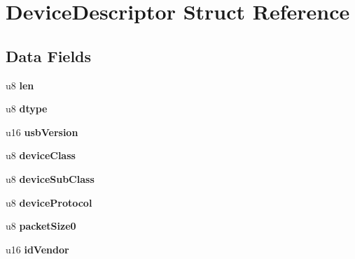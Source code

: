 \hypertarget{struct_device_descriptor}{\section{Device\-Descriptor Struct Reference}
\label{struct_device_descriptor}
}
\subsection*{Data Fields}
\begin{DoxyCompactItemize}
\item 
\hypertarget{struct_device_descriptor_afbf3f3230446569534d5f466aaf4c23b}{u8 {\bfseries len}}\label{struct_device_descriptor_afbf3f3230446569534d5f466aaf4c23b}

\item 
\hypertarget{struct_device_descriptor_a0bb419531ec75697e63e9109fecf81b0}{u8 {\bfseries dtype}}\label{struct_device_descriptor_a0bb419531ec75697e63e9109fecf81b0}

\item 
\hypertarget{struct_device_descriptor_a0d9dca86e0ffcd6d89828e4b8b0eb8a0}{u16 {\bfseries usb\-Version}}\label{struct_device_descriptor_a0d9dca86e0ffcd6d89828e4b8b0eb8a0}

\item 
\hypertarget{struct_device_descriptor_ac951c25b0d755d42cb5f4a13692d511c}{u8 {\bfseries device\-Class}}\label{struct_device_descriptor_ac951c25b0d755d42cb5f4a13692d511c}

\item 
\hypertarget{struct_device_descriptor_a243c174d359ded5ed54cf06d979cab2a}{u8 {\bfseries device\-Sub\-Class}}\label{struct_device_descriptor_a243c174d359ded5ed54cf06d979cab2a}

\item 
\hypertarget{struct_device_descriptor_a1fd727fcfe6f95b1da93b158569777dd}{u8 {\bfseries device\-Protocol}}\label{struct_device_descriptor_a1fd727fcfe6f95b1da93b158569777dd}

\item 
\hypertarget{struct_device_descriptor_a8ccac084f7a6348f5719d6081fcc044e}{u8 {\bfseries packet\-Size0}}\label{struct_device_descriptor_a8ccac084f7a6348f5719d6081fcc044e}

\item 
\hypertarget{struct_device_descriptor_a7a7c71d161c32f997811107e4d546ca8}{u16 {\bfseries id\-Vendor}}\label{struct_device_descriptor_a7a7c71d161c32f997811107e4d546ca8}


\end{DoxyCompactItemize}
